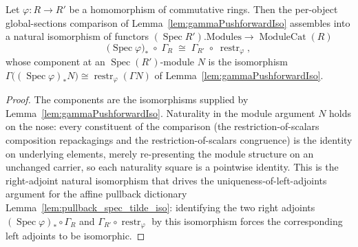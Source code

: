\begin{lemma}\leanok
  \label{lem:gammaPushforwardNatIso}
  Let \(\varphi : R \to R'\) be a homomorphism of commutative rings. Then the
  per-object global-sections comparison of
  Lemma~\ref{lem:gammaPushforwardIso} assembles into a natural isomorphism of
  functors \((\operatorname{Spec} R').\mathrm{Modules} \to \operatorname{ModuleCat}(R)\)
  \[
    \bigl(\operatorname{Spec}\varphi\bigr)_* \;\circ\; \Gamma_R
    \;\cong\;
    \Gamma_{R'} \;\circ\; \operatorname{restr}_\varphi ,
  \]
  whose component at an \(\operatorname{Spec}(R')\)-module \(N\) is the isomorphism
  \(\Gamma\bigl((\operatorname{Spec}\varphi)_* N\bigr) \cong
  \operatorname{restr}_\varphi(\Gamma N)\) of
  Lemma~\ref{lem:gammaPushforwardIso}.
\end{lemma}

\begin{proof}
  \leanok
  The components are the isomorphisms supplied by
  Lemma~\ref{lem:gammaPushforwardIso}. Naturality in the module argument \(N\)
  holds on the nose: every constituent of the comparison
  (the restriction-of-scalars composition repackagings and the
  restriction-of-scalars congruence) is the identity on underlying elements,
  merely re-presenting the module structure on an unchanged carrier, so each
  naturality square is a pointwise identity. This is the right-adjoint natural
  isomorphism that drives the uniqueness-of-left-adjoints argument for the affine
  pullback dictionary Lemma~\ref{lem:pullback_spec_tilde_iso}: identifying the two
  right adjoints \((\operatorname{Spec}\varphi)_* \circ \Gamma_R\) and
  \(\Gamma_{R'} \circ \operatorname{restr}_\varphi\) by this isomorphism forces the
  corresponding left adjoints to be isomorphic.
\end{proof}

